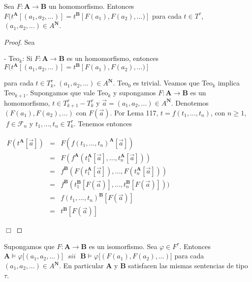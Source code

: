   \begin{lemma}
    Sea \(F:\mathbf{A}\rightarrow \mathbf{B}\) un homomorfismo. Entonces
    \(\displaystyle F(t^{\mathbf{A}}[(a_{1},a_{2},...)]=t^{\mathbf{B}}[F(a_{1}),F(a_{2}),...)] \)
    para cada \(t\in T^{\tau }\), \((a_{1},a_{2},...)\in A^{\mathbf{N}}\).
  \end{lemma}
  \begin{proof}
    Sea

    - Teo\(_{k}\): Si \(F:\mathbf{A}\rightarrow \mathbf{B}\) es un homomorfismo, entonces
    \(\displaystyle F(t^{\mathbf{A}}[(a_{1},a_{2},...)]=t^{\mathbf{B}}[F(a_{1}),F(a_{2}),...)] \)

    para cada \(t\in T_{k}^{\tau }\), \((a_{1},a_{2},...)\in A^{\mathbf{N}}\).
    Teo\(_{0}\) es trivial. Veamos que Teo\(_{k}\) implica Teo\(_{k+1}\). Supongamos que vale Teo\(_{k}\) y supongamos \(F:\mathbf{A}\rightarrow \mathbf{B}\) es un homomorfismo, \(t\in T_{k+1}^{\tau }-T_{k}^{\tau }\) y \(\vec{a} =(a_{1},a_{2},...)\in A^{\mathbf{N}}\). Denotemos \((F(a_{1}),F(a_{2}),...)\) con \(F(\vec{a})\). Por Lema 117, \(t=f(t_{1},...,t_{n})\), con \(n\geq 1 \),\(\;f\in \mathcal{F}_{n}\) y \(t_{1},...,t_{n}\in T_{k}^{\tau }\). Tenemos entonces

    \(\displaystyle \begin{array}{ccl} F(t^{\mathbf{A}}[\vec{a}]) & = & F(f(t_{1},...,t_{n})^{\mathbf{A}}[\vec{a}]) \\ & = & F(f^{\mathbf{A}}(t_{1}^{\mathbf{A}}[\vec{a}],...,t_{n}^{\mathbf{A}}[ \vec{a}])) \\ & = & f^{\mathbf{B}}(F(t_{1}^{\mathbf{A}}[\vec{a}]),...,F(t_{n}^{\mathbf{A}}[ \vec{a}])) \\ & = & f^{\mathbf{B}}(t_{1}^{\mathbf{B}}[F(\vec{a})],...,t_{n}^{\mathbf{B}}[F( \vec{a})])) \\ & = & f(t_{1},...,t_{n})^{\mathbf{B}}[F(\vec{a})] \\ & = & t^{\mathbf{B}}[F(\vec{a})] \end{array} \)

    \(\Box\)
  \end{proof}

  \begin{lemma}
    Supongamos que \(F:\mathbf{A}\rightarrow \mathbf{B}\) es un isomorfismo\(.\) Sea \(\varphi \in F^{\tau }.\) Entonces
    \(\displaystyle \mathbf{A}\models \varphi \lbrack (a_{1},a_{2},...)]\text{ }sii\text{ } \mathbf{B}\models \varphi \lbrack (F(a_{1}),F(a_{2}),...)] \)
    para cada \((a_{1},a_{2},...)\in A^{\mathbf{N}}\). En particular \(\mathbf{A}\) y \(\mathbf{B}\) satisfacen las mismas sentencias de tipo \(\tau \).
  \end{lemma}

